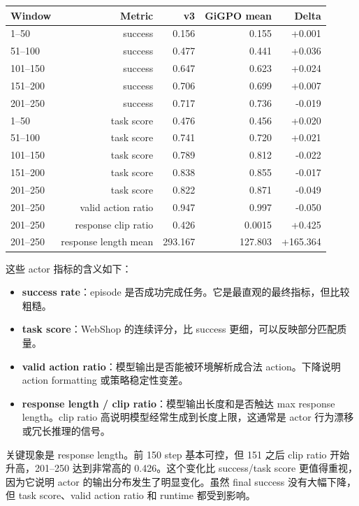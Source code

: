\documentclass[10pt]{ctexart}
\begin{document}
\begin{center}
\begin{tabular}{lrrrr}
\toprule
Window & Metric & v3 & GiGPO mean & Delta \\
\midrule
1--50 & success & 0.156 & 0.155 & +0.001 \\
51--100 & success & 0.477 & 0.441 & +0.036 \\
101--150 & success & 0.647 & 0.623 & +0.024 \\
151--200 & success & 0.706 & 0.699 & +0.007 \\
201--250 & success & 0.717 & 0.736 & -0.019 \\
\midrule
1--50 & task score & 0.476 & 0.456 & +0.020 \\
51--100 & task score & 0.741 & 0.720 & +0.021 \\
101--150 & task score & 0.789 & 0.812 & -0.022 \\
151--200 & task score & 0.838 & 0.855 & -0.017 \\
201--250 & task score & 0.822 & 0.871 & -0.049 \\
\midrule
201--250 & valid action ratio & 0.947 & 0.997 & -0.050 \\
201--250 & response clip ratio & 0.426 & 0.0015 & +0.425 \\
201--250 & response length mean & 293.167 & 127.803 & +165.364 \\
\bottomrule
\end{tabular}
\end{center}

这些 actor 指标的含义如下：
\begin{itemize}
  \item \textbf{success rate}：episode 是否成功完成任务。它是最直观的最终指标，但比较粗糙。
  \item \textbf{task score}：WebShop 的连续评分，比 success 更细，可以反映部分匹配质量。
  \item \textbf{valid action ratio}：模型输出是否能被环境解析成合法 action。下降说明 action formatting 或策略稳定性变差。
  \item \textbf{response length / clip ratio}：模型输出长度和是否触达 max response length。clip ratio 高说明模型经常生成到长度上限，这通常是 actor 行为漂移或冗长推理的信号。
\end{itemize}

关键现象是 response length。前 150 step 基本可控，但 151 之后 clip ratio 开始升高，201--250 达到非常高的 0.426。这个变化比 success/task score 更值得重视，因为它说明 actor 的输出分布发生了明显变化。虽然 final success 没有大幅下降，但 task score、valid action ratio 和 runtime 都受到影响。
\end{document}
